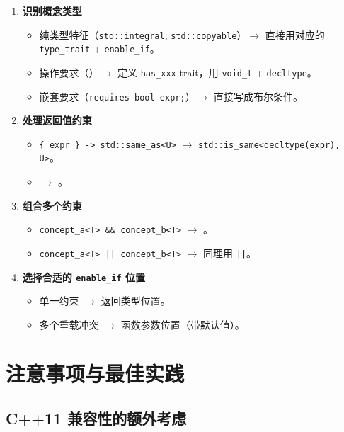\documentclass[12pt,a4paper,fontset=fandol]{ctexbook}
\begin{document}
\begin{enumerate}
  \item \textbf{识别概念类型}
  \begin{itemize}[nosep]
    \item 纯类型特征（\texttt{std::integral}, \texttt{std::copyable}）$\to$ 直接用对应的 \texttt{type\_trait} + \texttt{enable\_if}。
    \item 操作要求（\texttt{}）$\to$ 定义 \texttt{has\_xxx} trait，用 \texttt{void\_t} + \texttt{decltype}。
    \item 嵌套要求（\texttt{requires bool-expr;}）$\to$ 直接写成布尔条件。
  \end{itemize}
  \item \textbf{处理返回值约束}
  \begin{itemize}[nosep]
    \item \texttt{\{ expr \} -> std::same\_as<U>} $\to$ \texttt{std::is\_same<decltype(expr), U>}。
    \item \texttt{} $\to$ \texttt{}。
  \end{itemize}
  \item \textbf{组合多个约束}
  \begin{itemize}[nosep]
    \item \texttt{concept\_a<T> \&\& concept\_b<T>} $\to$ \texttt{}。
    \item \texttt{concept\_a<T> || concept\_b<T>} $\to$ 同理用 \texttt{||}。
  \end{itemize}
  \item \textbf{选择合适的 \texttt{enable\_if} 位置}
  \begin{itemize}[nosep]
    \item 单一约束 $\to$ 返回类型位置。
    \item 多个重载冲突 $\to$ 函数参数位置（带默认值）。
  \end{itemize}
\end{enumerate}

\section{注意事项与最佳实践}

\subsection{C++11 兼容性的额外考虑}
\end{document}
